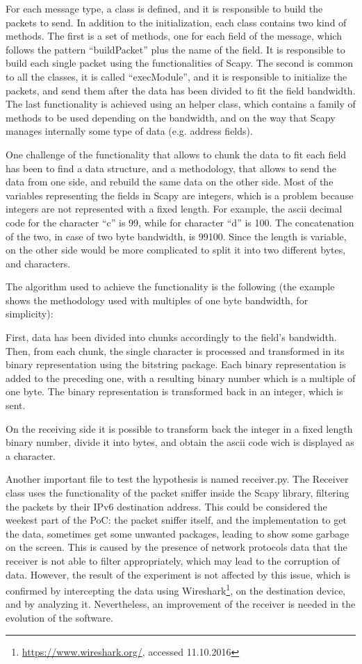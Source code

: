 \documentclass[12pt]{article}
\begin{document}
For each message type, a class is defined, and it is responsible to build the packets to send. In addition to the initialization, each class contains two kind of methods. The first is a set of methods, one for each field of the message, which follows the pattern ``buildPacket'' plus the name of the field. It is responsible to build each single packet using the functionalities of Scapy. The second is common to all the classes, it is called ``execModule'', and it is responsible to initialize the packets, and send them after the data has been divided to fit the field bandwidth. The last functionality is achieved using an helper class, which contains a family of methods to be used depending on the bandwidth, and on the way that Scapy manages internally some type of data (e.g. address fields).

One challenge of the functionality that allows to chunk the data to fit each field has been to find a data structure, and a methodology, that allows to send the data from one side, and rebuild the same data on the other side. Most of the variables representing the fields in Scapy are integers, which is a problem because integers are not represented with a fixed length. For example, the ascii decimal code for the character ``c'' is 99, while for character ``d'' is 100. The concatenation of the two, in case of two byte bandwidth, is 99100. Since the length is variable, on the other side would be more complicated to split it into two different bytes, and characters.

The algorithm used to achieve the functionality is the following (the example shows the methodology used with multiples of one byte bandwidth, for simplicity):

First, data has been divided into chunks accordingly to the field's bandwidth. Then, from each chunk, the single character is processed and transformed in its binary representation using the bitstring package. Each binary representation is added to the preceding one, with a resulting binary number which is a multiple of one byte. The binary representation is transformed back in an integer, which is sent.

On the receiving side it is possible to transform back the integer in a fixed length binary number, divide it into bytes, and obtain the ascii code wich is displayed as a character.

Another important file to test the hypothesis is named receiver.py. The Receiver class uses the functionality of the packet sniffer inside the Scapy library, filtering the packets by their IPv6 destination address. This could be considered the weekest part of the PoC: the packet sniffer itself, and the implementation to get the data, sometimes get some unwanted packages, leading to show some garbage on the screen. This is caused by the presence of network protocols data that the receiver is not able to filter appropriately, which may lead to the corruption of data. However, the result of the experiment is not affected by this issue, which is confirmed by intercepting the data using Wireshark\footnote{\url{https://www.wireshark.org/}, accessed 11.10.2016}, on the destination device, and by analyzing it. Nevertheless, an improvement of the receiver is needed in the evolution of the software.
\end{document}
